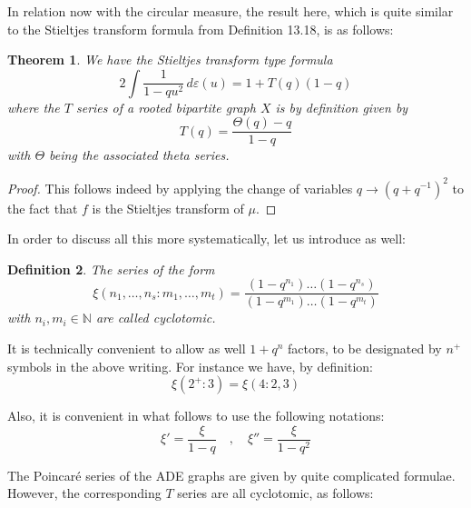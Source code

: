\documentclass[12pt]{amsbook}
\newtheorem{theorem}{Theorem}[chapter]
\newtheorem{definition}[theorem]{Definition}
\begin{document}
In relation now with the circular measure, the result here, which is quite similar to the Stieltjes transform formula from Definition 13.18, is as follows:

\begin{theorem}
We have the Stieltjes transform type formula
$$2\int\frac{1}{1-qu^2}\,d\varepsilon(u)=1+T(q)(1-q)$$
where the $T$ series of a rooted bipartite graph $X$ is by definition given by
$$T(q)=\frac{\Theta(q)-q}{1-q}$$
with $\Theta$ being the associated theta series.
\end{theorem}

\begin{proof}
This follows indeed by applying the change of variables $q\to (q+q^{-1})^2$ to the fact that $f$ is the Stieltjes transform of $\mu$.
\end{proof}

In order to discuss all this more systematically, let us introduce as well:

\begin{definition}
The series of the form
$$\xi(n_1,\ldots,n_s:m_1,\ldots,m_t)=\frac{(1-q^{n_1})\ldots(1-q^{n_s})}{(1-q^{m_1})\ldots(1-q^{m_t})}$$
with $n_i,m_i\in\mathbb N$ are called cyclotomic.
\end{definition}

It is technically convenient to allow as well $1+q^n$ factors, to be designated by $n^+$ symbols in the above writing. For instance we have, by definition:
$$\xi(2^+:3)=\xi(4:2,3)$$

Also, it is convenient in what follows to use the following notations:
$$\xi'=\frac{\xi}{1-q}\quad,\quad \xi''=\frac{\xi}{1-q^2}$$

The Poincar\'e series of the ADE graphs are given by quite complicated formulae. However, the corresponding $T$ series are all cyclotomic, as follows:
\end{document}
